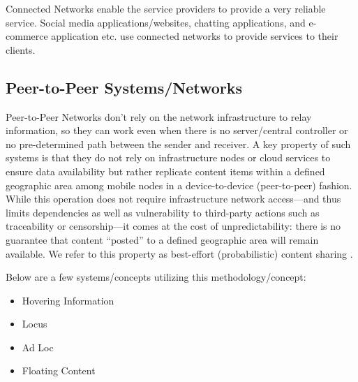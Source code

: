 Connected Networks enable the service providers to provide a very reliable service. Social media applications/websites, chatting applications, and e-commerce application etc. use connected networks to provide services to their clients.

\subsection{Peer-to-Peer Systems/Networks}
Peer-to-Peer Networks don't rely on the network infrastructure to relay information, so they can work even when there is no server/central controller or no pre-determined path between the sender and receiver. A key property of such systems is that they do not rely on infrastructure nodes or cloud services to ensure data availability but rather replicate content items within a defined geographic area among mobile nodes in a device-to-device (peer-to-peer) fashion. While this operation does not require infrastructure network access—and thus limits dependencies as well as vulnerability to third-party actions such as traceability or censorship—it comes at the cost of unpredictability: there is no guarantee that content “posted” to a defined geographic area will remain available. We refer to this property as best-effort (probabilistic) content sharing \cite{geo-based-content-sharing}.

Below are a few systems/concepts utilizing this methodology/concept:
\begin{itemize}
  \item Hovering Information \cite{Castro2009}
  \item Locus \cite{Thompson:2010:LLD:1859934.1859945}
  \item Ad Loc \cite{Corbett2006ADL}
  \item Floating Content \cite{floating-content}
\end{itemize}

